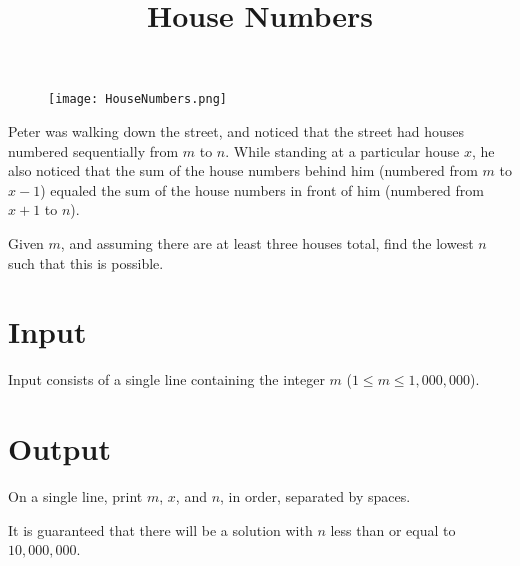 \documentclass{article}
\title{House Numbers}
\date{}
\begin{document}
\maketitle
\begin{figure}[h!]
\centering
\texttt{[image: HouseNumbers.png]}
\end{figure}


Peter was walking down the street, and noticed that the street had
houses numbered sequentially from $m$ to $n$. While standing at a
particular house $x$, he also noticed that the sum of the house numbers
behind him (numbered from $m$ to $x-1$) equaled the sum of the house numbers
in front of him (numbered from $x+1$ to $n$).

Given $m$, and assuming there are at
least three houses total, find the lowest $n$ such that this
is possible.

\section{Input}

Input consists of a single line containing the
integer $m$ ($1 \le m \le 1{,}000{,}000$).

\section{Output}

On a single line, print $m$, $x$, and $n$, in order, separated by spaces.

It is guaranteed that there will be a solution with $n$ less than or equal
to $10{,}000{,}000$.

\end{document}
